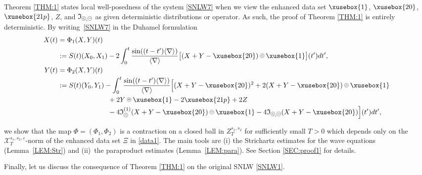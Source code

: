 \documentclass[%
11pt,  reqno]{amsart}
\def\<#1>{\xusebox{#1}}
\newcommand{\pe}{\mathbin{\scaleobj{0.7}{\tikz \draw (0,0) node[shape=circle,draw,inner sep=0pt,minimum size=8.5pt] {\scriptsize  $=$};}}}
\newcommand{\pl}{\mathbin{\scaleobj{0.7}{\tikz \draw (0,0) node[shape=circle,draw,inner sep=0pt,minimum size=8.5pt] {\scriptsize $<$};}}}
\newcommand{\pg}{\mathbin{\scaleobj{0.7}{\tikz \draw (0,0) node[shape=circle,draw,inner sep=0pt,minimum size=8.5pt] {\scriptsize $>$};}}}
\newcommand{\1}{\hspace{0.2mm}\text{I}\hspace{0.2mm}}
\newcommand{\noi}{\noindent}
\newcommand{\nb}{\nabla}
\newcommand{\eps}{\varepsilon}
\newcommand{\jb}[1]
{\langle #1 \rangle}
\newcommand{\If}{\mathfrak{I}}
\numberwithin{equation}{section}
\numberwithin{theorem}{section}
\begin{document}
Theorem \ref{THM:1} states local well-posedness of the system
\eqref{SNLW7} when we view 
the enhanced data set $\<1>$,  $\<20>$,  $\<21p>$,
$Z$, 
and $\If_{\pl, \pe}$ 
as given deterministic distributions or operator.
As such, the proof of Theorem \ref{THM:1} is entirely deterministic.
By writing~\eqref{SNLW7} in the Duhamel formulation
\begin{align}
\begin{split}
 X (t)  &  = \Phi_1(X, Y)(t) \\
 & := S(t)(X_0, X_1) - 2 \int_0^t \frac{\sin((t-t')\jb{\nb})}{\jb{\nb}} 
 \big[(X+Y - \<20>)\pl \<1>\big](t')dt',  \\
Y  (t) &   = \Phi_2(X, Y)(t) \\
 & :=
S(t)(Y_0, Y_1) -
 \int_0^t \frac{\sin((t-t')\jb{\nb})}{\jb{\nb}} 
\Big[(X+Y-\<20>)^2 +  2(X+Y-\<20>)\pg \<1>\\
& 
\hspace{25.5mm}
+ 2 Y\pe \<1> - 2 \<21p>
 + 2Z \\
& \hspace{25.5mm}
 -4 \If_{\pl}^{(1)}(X + Y - \<20>)\pe \<1> -4\If_{\pl, \pe}(X + Y - \<20>)\Big] (t') dt',
\end{split}
 \label{SNLW8}
\end{align}

\noi
we show  that the map $\Phi = (\Phi_1, \Phi_2)$
is a contraction on a closed ball in 
$Z^{s_1, s_2}_T$
for sufficiently small $T>0$
which  depends only on 
the $\mathcal{X}^{s_1, s_2, \eps}_T$-norm 
of the enhanced data set $\Xi$ in  \eqref{data1}.
The main tools are (i) the Strichartz estimates
for the wave equations (Lemma~\ref{LEM:Str}) 
and (ii)~the paraproduct estimates (Lemma~\ref{LEM:para}).
See Section \ref{SEC:proof1} for details.


\smallskip





Finally, let us discuss the consequence of Theorem \ref{THM:1}
on the original SNLW \eqref{SNLW1}.
\end{document}

